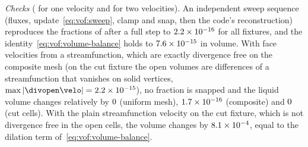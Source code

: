 \emph{Checks} ( for one velocity and
 for two velocities). An independent sweep
sequence (fluxes, update~\cref{eq:vof:sweep}, clamp and snap, then the code's
reconstruction) reproduces the fractions of  after a full step
to $2.2\times10^{-16}$ for all fixtures, and the
identity~\cref{eq:vof:volume-balance} holds to $7.6\times10^{-15}$ in
volume. With face velocities from a streamfunction, which are exactly
divergence free on the composite mesh (on the cut fixture the open volumes are
differences of a streamfunction that vanishes on solid vertices,
$\max\abs{\divopen\velo}=\chkVofOpenDivergence$), no fraction is snapped and the
liquid volume changes relatively by $0$ (uniform mesh),
$1.7\times10^{-16}$ (composite) and $0$ (cut cells). With the plain
streamfunction velocity on the cut fixture, which is not divergence free in
the open cells, the volume changes by $8.1\times10^{-4}$, equal to the
dilation term of~\cref{eq:vof:volume-balance}.
